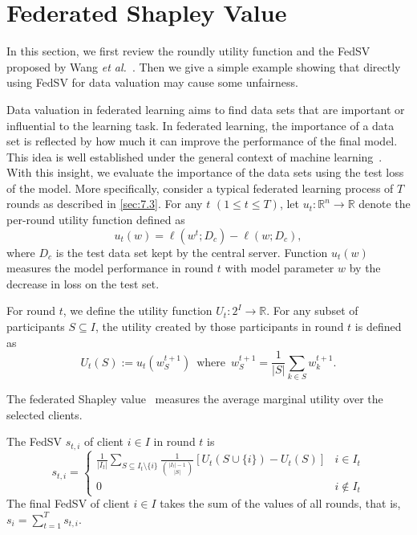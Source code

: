 \section{Federated Shapley Value} \label{sec:7.4}

In this section, we first review the roundly utility function and the FedSV proposed by Wang \textit{et al.}~\cite{wang2020principled}. Then we give a simple example showing that directly using FedSV for data valuation may cause some unfairness. 

Data valuation in federated learning aims to find data sets that are important or influential to the learning task. In federated learning, the importance of a data set is reflected by how much it can improve the performance of the final model. This idea is well established under the general context of machine learning~\cite{ghorbani2019data}. With this insight, we evaluate the importance of the data sets using the test loss of the model. More specifically, consider a typical federated learning process of $T$ rounds as described in \autoref{sec:7.3}. For any $t$ $(1 \leq t \leq T)$, let $u_t: \mathbb{R}^n \to \mathbb{R}$ denote the per-round utility function defined as
\begin{equation} \label{eq:utility}
    u_t(w) = \ell(w^t; D_c) - \ell(w; D_c),
\end{equation}
where $D_c$ is the test data set kept by the central server. Function $u_t(w)$ measures the model performance in round $t$ with model parameter $w$ by the decrease in loss on the test set. 

For round $t $, we define the utility function $U_t : 2^{I} \to \mathbb{R}$. For any subset of participants $S \subseteq I$, the utility created by those participants in round $t$ is defined as
\[U_t(S) := u_t(w_S^{t+1})  \enspace\text{where}\enspace w_S^{t+1} = \frac{1}{|S|}\sum_{k\in S} w_k^{t+1}.\]

The federated Shapley value~\cite{wang2020principled} measures the average marginal utility over the selected clients. 
\begin{definition} \label{def:federated_sv}
    The FedSV $s_{t, i}$ of client $i \in I$ in round $t$ is 
    \begin{equation*}
    s_{t, i} = 
        \begin{cases} 
      \frac{1}{|I_t|} \sum\limits_{S \subseteq I_t \setminus\{i\}} \frac{1}{\binom{|I_t|-1}{|S|}} \left[U_t(S\cup\{i\}) - U_t(S)\right] & i \in I_t \\
      0 & i \notin I_t 
   \end{cases}
    \end{equation*}
    The final FedSV of client $i \in I$ takes the sum of the values of all rounds, that is, 
   $s_i = \sum_{t=1}^T s_{t, i}$.
\end{definition}

